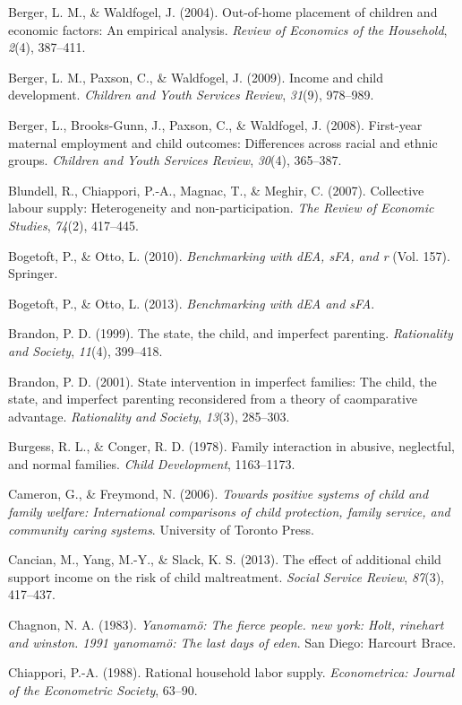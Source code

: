 \documentclass[]{elsarticle}
\begin{document}
Berger, L. M., \& Waldfogel, J. (2004). Out-of-home placement of
children and economic factors: An empirical analysis. \emph{Review of
Economics of the Household}, \emph{2}(4), 387--411.

Berger, L. M., Paxson, C., \& Waldfogel, J. (2009). Income and child
development. \emph{Children and Youth Services Review}, \emph{31}(9),
978--989.

Berger, L., Brooks-Gunn, J., Paxson, C., \& Waldfogel, J. (2008).
First-year maternal employment and child outcomes: Differences across
racial and ethnic groups. \emph{Children and Youth Services Review},
\emph{30}(4), 365--387.

Blundell, R., Chiappori, P.-A., Magnac, T., \& Meghir, C. (2007).
Collective labour supply: Heterogeneity and non-participation. \emph{The
Review of Economic Studies}, \emph{74}(2), 417--445.

Bogetoft, P., \& Otto, L. (2010). \emph{Benchmarking with dEA, sFA, and
r} (Vol. 157). Springer.

Bogetoft, P., \& Otto, L. (2013). \emph{Benchmarking with dEA and sFA}.

Brandon, P. D. (1999). The state, the child, and imperfect parenting.
\emph{Rationality and Society}, \emph{11}(4), 399--418.

Brandon, P. D. (2001). State intervention in imperfect families: The
child, the state, and imperfect parenting reconsidered from a theory of
caomparative advantage. \emph{Rationality and Society}, \emph{13}(3),
285--303.

Burgess, R. L., \& Conger, R. D. (1978). Family interaction in abusive,
neglectful, and normal families. \emph{Child Development}, 1163--1173.

Cameron, G., \& Freymond, N. (2006). \emph{Towards positive systems of
child and family welfare: International comparisons of child protection,
family service, and community caring systems}. University of Toronto
Press.

Cancian, M., Yang, M.-Y., \& Slack, K. S. (2013). The effect of
additional child support income on the risk of child maltreatment.
\emph{Social Service Review}, \emph{87}(3), 417--437.

Chagnon, N. A. (1983). \emph{Yanomamö: The fierce people. new york:
Holt, rinehart and winston. 1991 yanomamö: The last days of eden}. San
Diego: Harcourt Brace.

Chiappori, P.-A. (1988). Rational household labor supply.
\emph{Econometrica: Journal of the Econometric Society}, 63--90.
\end{document}
